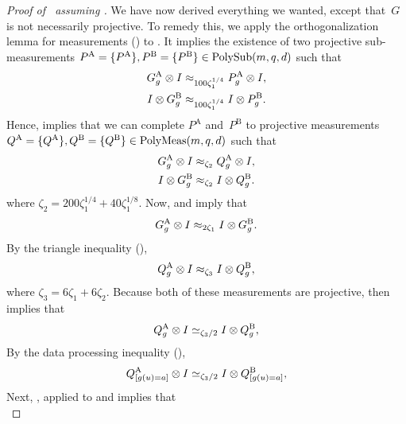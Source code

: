 \begin{proof}[Proof of~ assuming ]
We have now derived everything we wanted, except that~$G$ is not necessarily projective.
To remedy this, we apply the orthogonalization lemma for measurements ()
to .
It implies the existence of two projective sub-measurements $P^{\mathrm{A}} = \{P^{\mathrm{A}}\}, P^{\mathrm{B}} = \{P^{\mathrm{B}}\} \in \mathrm{PolySub}(m, q, d)$ such that
\begin{align*}
G^{\mathrm{A}}_g \otimes I &\approx_{100\zeta_1^{1/4}} P^{\mathrm{A}}_g \otimes I,\\
I \otimes G^{\mathrm{B}}_g &\approx_{100\zeta_1^{1/4}} I \otimes P^{\mathrm{B}}_g.
\end{align*}
Hence,  implies that we can complete $P^{\mathrm{A}}$ and~$P^{\mathrm{B}}$ to projective measurements
$Q^{\mathrm{A}} = \{Q^{\mathrm{A}}\}, Q^{\mathrm{B}} = \{Q^{\mathrm{B}}\} \in \mathrm{PolyMeas}(m, q, d)$ such that
\begin{align}
G^{\mathrm{A}}_g \otimes I &\approx_{\zeta_2} Q^{\mathrm{A}}_g \otimes I,\label{eq:G-with-Q-A}\\
I \otimes G^{\mathrm{B}}_g &\approx_{\zeta_2} I \otimes Q^{\mathrm{B}}_g.\nonumber
\end{align}
where $\zeta_2= 200\zeta_1^{1/4} + 40\zeta_1^{1/8}$.
Now,   and  imply that
\begin{equation*}
G^{\mathrm{A}}_g \otimes I \approx_{2\zeta_1} I \otimes G^{\mathrm{B}}_g.
\end{equation*}
By the triangle inequality (),
\begin{equation*}
Q_g^{\mathrm{A}} \otimes I \approx_{\zeta_3} I \otimes Q_g^{\mathrm{B}},
\end{equation*}
where $\zeta_3 = 6\zeta_1 + 6\zeta_2$.
Because both of these measurements are projective,  then implies that
\begin{equation}\label{eq:third-goal}
Q_g^{\mathrm{A}} \otimes I \simeq_{\zeta_3/2} I \otimes Q_g^{\mathrm{B}},
\end{equation}
By the data processing inequality (),
\begin{equation}\label{eq:just-data-processed-the-heck-outta-this}
Q_{[g(u)=a]}^{\mathrm{A}} \otimes I \simeq_{\zeta_3/2} I \otimes Q_{[g(u)=a]}^{\mathrm{B}},
\end{equation}
Next, , applied to  and  implies that
\begin{equation*}

\end{equation*}
\end{proof}
